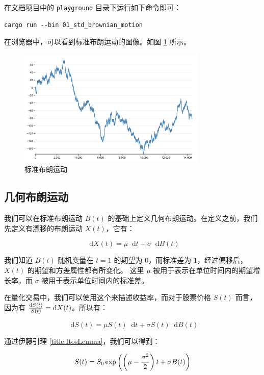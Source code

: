 \documentclass[utf8,a4paper,nofonts]{ctexbook}
\def\dif{\mathop{}\!\mathrm{d}}
\begin{document}
在文档项目中的 \verb|playground| 目录下运行如下命令即可：

\begin{lstlisting}
cargo run --bin 01_std_brownian_motion
\end{lstlisting}

在浏览器中，可以看到标准布朗运动的图像。如图 \ref{fig:stdBrownianMotion} 所示。

\begin{figure}[h]
    \centering
    \includegraphics[width=0.8\textwidth]{src/static/00_std_brownian_motion.png}
    \caption{标准布朗运动}
    \label{fig:stdBrownianMotion}
\end{figure}

\subsection[几何布朗运动]{几何布朗运动\protect\footnotemark}

我们可以在标准布朗运动 $B(t)$ 的基础上定义几何布朗运动。在定义之前，我们先定义有漂移的布朗运动 $X(t)$，它有：

$$
\dif{X(t)} = \mu \dif{t} + \sigma \dif{B(t)}
$$

我们知道 $B(t)$ 随机变量在 $t = 1$ 的期望为 $0$，而标准差为 $1$，经过偏移后，$X(t)$ 的期望和方差属性都有所变化。
这里 $\mu$ 被用于表示在单位时间内的期望增长率，而 $\sigma$ 被用于表示单位时间内的标准差。

在量化交易中，我们可以使用这个来描述收益率，而对于股票价格 $S(t)$ 而言，因为有 ${\dif{S(t)} \over S(t)} = \dif{X(t)}$。所以有：

$$
\dif{S(t)} = \mu S(t) \dif{t} + \sigma S(t) \dif{B(t)}
$$

通过伊藤引理 \ref{title:ItosLemma}，我们可以得到：

$$
S(t) = S_0 \exp\left(\left(\mu - {\sigma^2 \over 2}\right)t + \sigma B(t)\right)
$$
\end{document}
